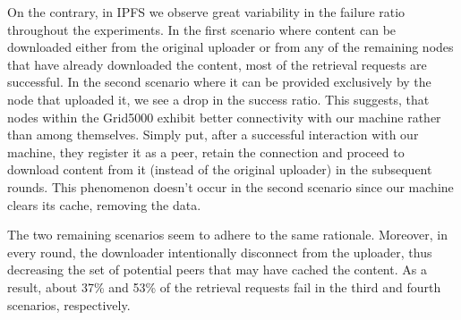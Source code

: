 On the contrary, in IPFS we observe great variability in the failure ratio throughout the experiments. In the first scenario where content can be downloaded either from the original uploader or from any of the remaining nodes that have already downloaded the content, most of the retrieval requests are successful. In the second scenario where it can be provided exclusively by the node that uploaded it, we see a drop in the success ratio. This suggests, that nodes within the Grid5000 exhibit better connectivity with our machine rather than among themselves. Simply put,  after a successful interaction with our machine, they register it as a peer, retain the connection and proceed to download content from it (instead of the original uploader) in the subsequent rounds. This phenomenon doesn't occur in the second scenario since our machine clears its cache, removing the data.



The two remaining scenarios seem to adhere to the same rationale. Moreover, in every round, the downloader intentionally disconnect from the uploader, thus decreasing the set of potential peers that may have cached the content. 
As a result, about 37\% and 53\% of the retrieval requests fail in the third and fourth scenarios, respectively.

